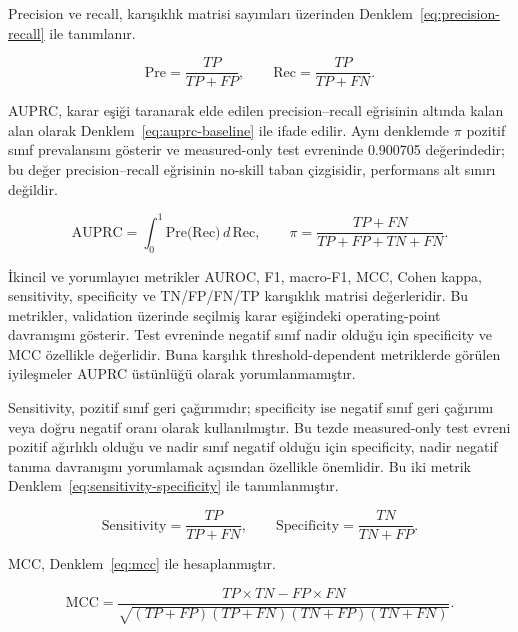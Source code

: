 Precision ve recall, karışıklık matrisi sayımları üzerinden Denklem~\ref{eq:precision-recall} ile tanımlanır.

\begin{equation}
\mathrm{Pre} = \frac{TP}{TP+FP}, \qquad
\mathrm{Rec} = \frac{TP}{TP+FN}.
\label{eq:precision-recall}
\end{equation}

AUPRC, karar eşiği taranarak elde edilen precision--recall eğrisinin altında kalan alan olarak Denklem~\ref{eq:auprc-baseline} ile ifade edilir. Aynı denklemde \(\pi\) pozitif sınıf prevalansını gösterir ve measured-only test evreninde 0.900705 değerindedir; bu değer precision--recall eğrisinin no-skill taban çizgisidir, performans alt sınırı değildir.

\begin{equation}
\mathrm{AUPRC} = \int_{0}^{1} \mathrm{Pre}\big(\mathrm{Rec}\big)\, d\,\mathrm{Rec},
\qquad
\pi = \frac{TP+FN}{TP+FP+TN+FN}.
\label{eq:auprc-baseline}
\end{equation}

İkincil ve yorumlayıcı metrikler AUROC, F1, macro-F1, MCC, Cohen kappa, sensitivity, specificity ve TN/FP/FN/TP karışıklık matrisi değerleridir. Bu metrikler, validation üzerinde seçilmiş karar eşiğindeki operating-point davranışını gösterir. Test evreninde negatif sınıf nadir olduğu için specificity ve MCC özellikle değerlidir. Buna karşılık threshold-dependent metriklerde görülen iyileşmeler AUPRC üstünlüğü olarak yorumlanmamıştır.

Sensitivity, pozitif sınıf geri çağırımıdır; specificity ise negatif sınıf geri çağırımı veya doğru negatif oranı olarak kullanılmıştır. Bu tezde measured-only test evreni pozitif ağırlıklı olduğu ve nadir sınıf negatif olduğu için specificity, nadir negatif tanıma davranışını yorumlamak açısından özellikle önemlidir. Bu iki metrik Denklem~\ref{eq:sensitivity-specificity} ile tanımlanmıştır.

\begin{equation}
\mathrm{Sensitivity} = \frac{TP}{TP+FN}, \qquad
\mathrm{Specificity} = \frac{TN}{TN+FP}.
\label{eq:sensitivity-specificity}
\end{equation}

MCC, Denklem~\ref{eq:mcc} ile hesaplanmıştır.

\begin{equation}
\mathrm{MCC} =
\frac{TP \times TN - FP \times FN}
{\sqrt{(TP+FP)(TP+FN)(TN+FP)(TN+FN)}}.
\label{eq:mcc}
\end{equation}

